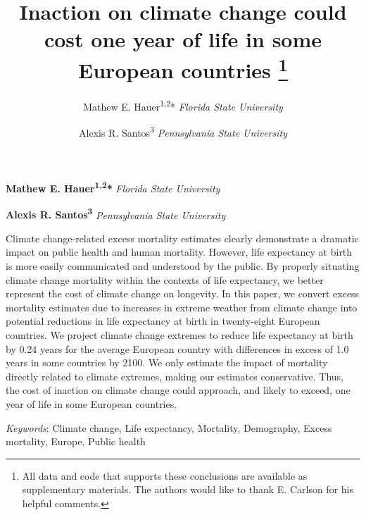 \documentclass[12pt,]{article}
\title{Inaction on climate change could cost one year of life in some European
countries \thanks{All data and code that supports these conclusions are available as
supplementary materials. The authors would like to thank E. Carlson for
his helpful comments.}  }
\author{\Large Mathew E. Hauer\textsuperscript{1,2}*\vspace{0.05in} \newline\normalsize\emph{Florida State University}   \and \Large Alexis R. Santos\textsuperscript{3}\vspace{0.05in} \newline\normalsize\emph{Pennsylvania State University}  }
\date{}
\newcommand*{\authorfont}{\fontfamily{phv}\selectfont}
\renewenvironment{abstract}
 {{%
    \setlength{\leftmargin}{0mm}
    \setlength{\rightmargin}{\leftmargin}%
  }%
  \relax}
 {\endlist}
\begin{document}
	
%

{%
\setlength{\parindent}{0pt}
\thispagestyle{plain}
{\fontsize{18}{20}\selectfont\raggedright 
\maketitle  %

}

{
   \vskip 13.5pt\relax \normalsize\fontsize{11}{12} 
\textbf{\authorfont Mathew E. Hauer\textsuperscript{1,2}*} \hskip 15pt \emph{\small Florida State University}   \par \textbf{\authorfont Alexis R. Santos\textsuperscript{3}} \hskip 15pt \emph{\small Pennsylvania State University}   

}

}








\begin{abstract}

    \hbox{\vrule height .2pt width 39.14pc}

    \vskip 8.5pt %

\noindent Climate change-related excess mortality estimates clearly demonstrate a
dramatic impact on public health and human mortality. However, life
expectancy at birth is more easily communicated and understood by the
public. By properly situating climate change mortality within the
contexts of life expectancy, we better represent the cost of climate
change on longevity. In this paper, we convert excess mortality
estimates due to increases in extreme weather from climate change into
potential reductions in life expectancy at birth in twenty-eight
European countries. We project climate change extremes to reduce life
expectancy at birth by 0.24 years for the average European country with
differences in excess of 1.0 years in some countries by 2100. We only
estimate the impact of mortality directly related to climate extremes,
making our estimates conservative. Thus, the cost of inaction on climate
change could approach, and likely to exceed, one year of life in some
European countries.


\vskip 8.5pt \noindent \emph{Keywords}: Climate change, Life expectancy, Mortality, Demography, Excess
mortality, Europe, Public health \par

    \hbox{\vrule height .2pt width 39.14pc}



\end{abstract}
\end{document}
